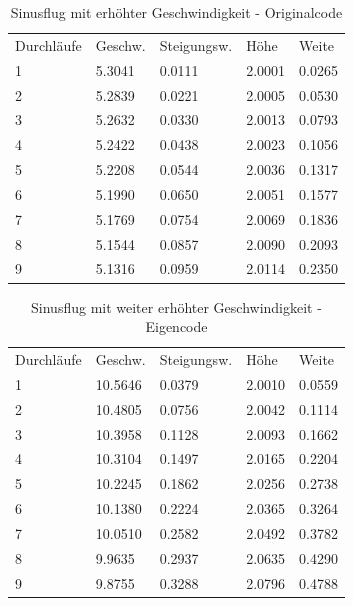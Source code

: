 \documentclass[a4paper,12pt]{scrartcl}
\begin{document}
\begin{table}
\centering
\caption{Sinusflug mit erhöhter Geschwindigkeit - Originalcode}
\begin{tabular}{lllll}
Durchläufe & Geschw. & Steigungsw. & Höhe    & Weite    \\
1          & 5.3041 & 0.0111     & 2.0001 & 0.0265  \\
2          & 5.2839 & 0.0221     & 2.0005 & 0.0530  \\
3          & 5.2632 & 0.0330     & 2.0013 & 0.0793  \\
4          & 5.2422 & 0.0438     & 2.0023 & 0.1056  \\
5          & 5.2208 & 0.0544     & 2.0036 & 0.1317  \\
6          & 5.1990 & 0.0650     & 2.0051 & 0.1577  \\
7          & 5.1769 & 0.0754     & 2.0069 & 0.1836  \\
8          & 5.1544 & 0.0857     & 2.0090 & 0.2093  \\
9          & 5.1316 & 0.0959     & 2.0114 & 0.2350 
\end{tabular}
\end{table}
\begin{table}
\centering
\caption{Sinusflug mit weiter erhöhter Geschwindigkeit -  Eigencode}
\begin{tabular}{lllll}
Durchläufe & Geschw. & Steigungsw. & Höhe   & Weite   \\
1          & 10.5646 & 0.0379      & 2.0010 & 0.0559  \\
2          & 10.4805 & 0.0756      & 2.0042 & 0.1114  \\
3          & 10.3958 & 0.1128      & 2.0093 & 0.1662  \\
4          & 10.3104 & 0.1497      & 2.0165 & 0.2204  \\
5          & 10.2245 & 0.1862      & 2.0256 & 0.2738  \\
6          & 10.1380 & 0.2224      & 2.0365 & 0.3264  \\
7          & 10.0510 & 0.2582      & 2.0492 & 0.3782  \\
8          & 9.9635  & 0.2937      & 2.0635 & 0.4290  \\
9          & 9.8755  & 0.3288      & 2.0796 & 0.4788 
\end{tabular}
\end{table}
\end{document}
